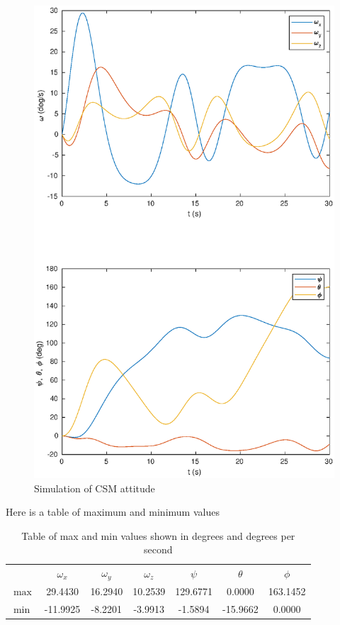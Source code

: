 \documentclass[a4paper]{article}
\begin{document}
\begin{enumerate}[a.]
\begin{figure}[H]
\begin{center}
      \includegraphics[scale=0.7]{task_e_c.eps}
    \end{center}
    \caption{Simulation of CSM attitude}
    \end{figure}
    Here is a table of maximum and minimum values
    \begin{table}[H]
      \centering
      \begin{tabular}{lcccccc}
        & $\omega_x$ & $\omega_y$ & $\omega_z$ & $\psi$ & $\theta$ & $\phi$ \\
        $\max$ &  29.4430 & 16.2940 & 10.2539 & 129.6771 & 0.0000 & 163.1452 \\
        $\min$ & -11.9925 & -8.2201 & -3.9913 & -1.5894 & -15.9662 & 0.0000 \\
      \end{tabular}
      \caption{Table of max and min values shown in degrees and degrees per second}
    \end{table}
\end{enumerate}
\end{document}
